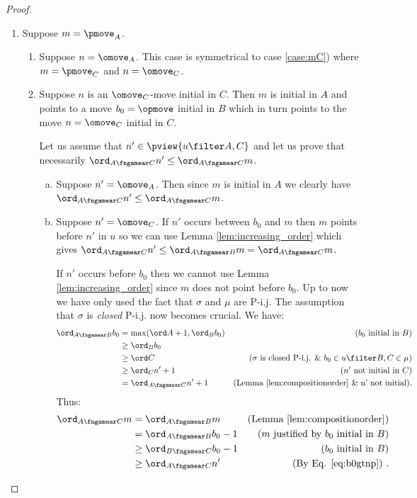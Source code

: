 \begin{proof}
\begin{enumerate}[1)]
\item \label{case:mA} Suppose $m = \pmove_A$.
\begin{enumerate}

\item Suppose $n=\omove_A$.
This case is symmetrical to case
\ref{case:mC}) where $m=\pmove_C$ and $n=\omove_C$.

\item Suppose  $n$ is an $\omove_C$-move initial in $C$.
Then $m$ is initial in $A$ and points to a move
$b_0 = \opmove$ initial in $B$ which in turn points to the
move $n =\omove_C$ initial in $C$.

Let us assume that $n'\in \pview{u\filter A,C}$ and let us prove that necessarily $\ord_{A\fngamear C} n' \leq \ord_{A\fngamear C} m$.

	\begin{enumerate}[a.]
	\item Suppose $n'=\omove_A$. Then
since $m$ is initial in $A$ we clearly have 
$\ord_{A\fngamear C} n' \leq \ord_{A\fngamear C} m$.

	\item Suppose $n'=\omove_C$.
	If $n'$ occurs between $b_0$ and $m$ then $m$ points before $n'$ in 		$u$ so we can use Lemma \ref{lem:increasing_order} which gives $\ord_{A\fngamear C} n' \leq \ord_{A\fngamear B} m
		= \ord_{A\fngamear C} m$.
		\smallskip
		
		
		If $n'$ occurs before $b_0$ then 
		we cannot use Lemma \ref{lem:increasing_order}
		since $m$ does not point before $b_0$.
Up to now we have only used the fact that $\sigma$ and $\mu$ are P-i.j. The assumption that $\sigma$ is  \emph{closed} P-i.j. now becomes crucial. We have:
		\begin{align}
		\ord_{A\fngamear B} b_0 
		& = \max(\ord A +1, \ord_B b_0) & \mbox{($b_0$ initial in $B$)} \nonumber \\
		& \geq \ord_B b_0 \nonumber  \\
		& \geq \ord C & \mbox{($\sigma$ is closed P-i.j. \& $b_0 \in u \filter  B,C \in \mu$)} \nonumber  \\
		& \geq \ord_C n' +1 & \mbox{($n'$ not initial in $C$)} \nonumber  \\
		& = \ord_{A\fngamear C} n' +1 & \mbox{(Lemma \ref{lem:compositionorder} \& \mbox{n' not initial})}. \label{eq:b0gtnp}
		\end{align}
Thus:
		\begin{align*}
		\ord_{A\fngamear C} m 
		& = \ord_{A\fngamear B} m & \mbox{(Lemma \ref{lem:compositionorder})} \\
		& = \ord_{A\fngamear B} b_0 -1  & \mbox{($m$ justified by $b_0$ initial in $B$)} \\
		& \geq \ord_{B\fngamear C} b_0 -1 & \mbox{($b_0$ initial in $B$)} \\
		& \geq \ord_{A\fngamear C} n' & \mbox{(By Eq. \ref{eq:b0gtnp})} \ .
		\end{align*}
		\end{enumerate}


\end{enumerate}
\end{enumerate}
\end{proof}
